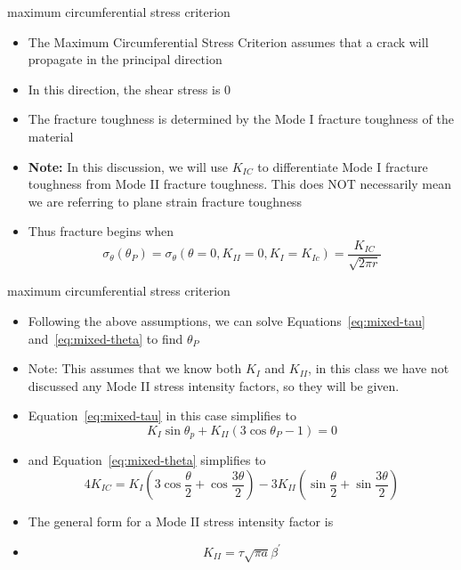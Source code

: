 \documentclass[10pt]{beamer}
\begin{document}
\begin{frame}{maximum circumferential stress criterion}
	\begin{itemize}[<+->]
		\item The Maximum Circumferential Stress Criterion assumes that a crack will propagate in the principal direction
		\item In this direction, the shear stress is 0
		\item The fracture toughness is determined by the Mode I fracture toughness of the material
		\item \textbf{Note:} In this discussion, we will use $K_{IC}$ to differentiate Mode I fracture toughness from Mode II fracture toughness. This does NOT necessarily mean we are referring to plane strain fracture toughness
		\item Thus fracture begins when
		\begin{equation}
		\sigma_{\theta}(\theta_P) = \sigma_\theta(\theta=0, K_{II}=0, K_I = K_{Ic}) = \frac{K_{IC}}{\sqrt{2\pi r}}
		\end{equation}
	\end{itemize}
\end{frame}

\begin{frame}{maximum circumferential stress criterion}
	\begin{itemize}[<+->]
		\item Following the above assumptions, we can solve Equations~\ref{eq:mixed-tau} and~\ref{eq:mixed-theta} to find $\theta_P$
		\item Note: This assumes that we know both $K_I$ and $K_{II}$, in this class we have not discussed any Mode II stress intensity factors, so they will be given.
		\item Equation~\ref{eq:mixed-tau} in this case simplifies to
		\begin{equation}
		K_I \sin \theta_p + K_{II} (3\cos \theta_P -1) = 0
		\end{equation}
		\item and Equation~\ref{eq:mixed-theta} simplifies to
		\begin{equation}
		4K_{IC} = K_I\left(3\cos \frac{\theta}{2} + \cos \frac{3\theta}{2}\right) - 3K_{II}\left(\sin \frac{\theta}{2} + \sin \frac{3\theta}{2}\right)
		\end{equation}
		\item The general form for a Mode II stress intensity factor is
		\item[]
		\begin{equation}
		K_{II} = \tau \sqrt{\pi a} \beta^\prime
		\end{equation}
	\end{itemize}
\end{frame}
\end{document}
